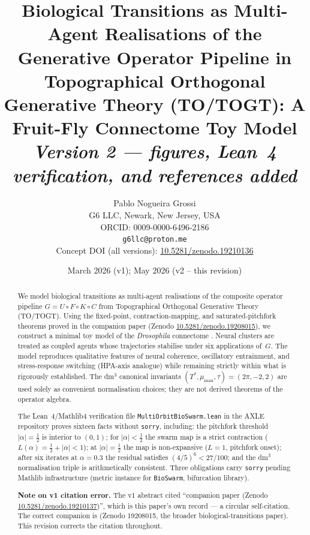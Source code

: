 \documentclass[12pt,a4paper]{article}
\title{%
  \textbf{Biological Transitions as Multi-Agent Realisations of the}\\
  \textbf{Generative Operator Pipeline in Topographical Orthogonal}\\
  \textbf{Generative Theory (TO/TOGT): A Fruit-Fly Connectome Toy Model}\\[0.5em]
  \large\emph{Version 2 --- figures, Lean~4 verification, and references added}%
}
\author{%
  Pablo Nogueira Grossi\\
  G6 LLC, Newark, New Jersey, USA\\
  ORCID: 0009-0000-6496-2186\\
  \texttt{g6llc@proton.me}\\[0.3em]
  \small Concept DOI (all versions):
    \href{https://doi.org/10.5281/zenodo.19210136}{10.5281/zenodo.19210136}
}
\date{March 2026 (v1); May 2026 (v2 -- this revision)}
\begin{document}
\maketitle

\begin{abstract}
We model biological transitions as multi-agent realisations of the
composite operator pipeline $G = U \circ F \circ K \circ C$ from
Topographical Orthogonal Generative Theory (TO/TOGT). Using the
fixed-point, contraction-mapping, and saturated-pitchfork theorems
proved in the companion paper \cite{Grossi2026_MultiAgent} (Zenodo
\href{https://doi.org/10.5281/zenodo.19208015}{10.5281/zenodo.19208015}),
we construct a minimal toy model of the \textit{Drosophila} connectome
\cite{Dorkenwald2024}. Neural clusters are treated as coupled agents
whose trajectories stabilise under six applications of~$G$. The model
reproduces qualitative features of neural coherence, oscillatory
entrainment, and stress-response switching (HPA-axis analogue) while
remaining strictly within what is rigorously established. The dm$^3$
canonical invariants $(T^{*}, \mu_{\max}, \tau) = (2\pi, -2, 2)$ are
used solely as convenient normalisation choices; they are not derived
theorems of the operator algebra.

The Lean~4/Mathlib4 verification file \texttt{MultiOrbitBioSwarm.lean}
in the AXLE repository \cite{AXLE2026} proves sixteen facts without
\texttt{sorry}, including: the pitchfork threshold $|\alpha|=\tfrac{1}{2}$
is interior to $(0,1)$; for $|\alpha|<\tfrac{1}{2}$ the swarm map is
a strict contraction ($L(\alpha)=\tfrac{1}{2}+|\alpha|<1$); at
$|\alpha|=\tfrac{1}{2}$ the map is non-expansive ($L=1$, pitchfork
onset); after six iterates at $\alpha=0.3$ the residual satisfies
$(4/5)^{6}<27/100$; and the dm$^3$ normalisation triple is
arithmetically consistent.  Three obligations carry \texttt{sorry}
pending Mathlib infrastructure (metric instance for \texttt{BioSwarm},
bifurcation library).

\smallskip\noindent\textbf{Note on v1 citation error.}
The v1 abstract cited ``companion paper (Zenodo
\href{https://doi.org/10.5281/zenodo.19210137}{10.5281/zenodo.19210137})'',
which is this paper's own record --- a circular self-citation. The
correct companion is \cite{Grossi2026_MultiAgent} (Zenodo 19208015,
the broader biological-transitions paper). This revision corrects the
citation throughout.
\end{abstract}
\end{document}
